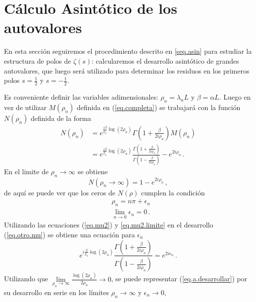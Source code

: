 \section{Cálculo Asintótico de los autovalores}\label{seq.2.asin}

En esta sección seguiremos el procedimiento descrito en \ref{seq.asin} para estudiar la estructura de polos de $\zeta (s)$: calcularemos el desarrollo asintótico de grandes autovalores, que luego será utilizado para determinar los residuos en los primeros polos $s= \frac{1}{2}$ y $s= - \frac{1}{2}$.



Es conveniente definir las variables adimensionales: $\rho _n = \lambda _nL $ y $\beta = \alpha L$. Luego en vez de utilizar $M (\rho _n)$ definida en (\ref{eq.completa}) se trabajará con la función $N (\rho _n)$ definida de la forma
\begin{align}
\label{eq.otro.mu}
\nonumber
N (\rho _n) &=
e ^{\frac{i \beta }{\rho _n} \log(2 \rho _n) }
\Gamma \left( 1 + \frac{ \beta}{2 i \rho _n} \right)
M (\rho _n) \\ 
&=  
e ^{\frac{i \beta }{\rho _n} \log(2 \rho _n) }
\frac{\Gamma \left(1 + \frac{ \beta}{2 i \rho _n} \right)}
	{\Gamma \left(1 - \frac{ \beta}{2 i \rho _n} \right)}
- e ^{2 i \rho _n}
\, .
\end{align}
En el limite de $\rho _n \rightarrow \infty$ se obtiene
\begin{equation}
    N(\rho _n  \rightarrow \infty) = 
	1 - e ^{2 i \rho _n}
		\, ,
\end{equation}
de aquí se puede ver que los ceros de $N ( \rho ) $ cumplen la condición
\begin{align}
\label{eq.mu2}
    &\rho _n = n \pi + \epsilon _n \\[5pt]
\label{eq.mu2.limite}
	&\lim \limits _{n \rightarrow{0}} \epsilon _n  = 0
		\, .
\end{align}
Utilizando las ecuaciones (\ref{eq.mu2}) y \eqref{eq.mu2.limite} en el desarrollo (\ref{eq.otro.mu}) se obtiene una ecuación para $\epsilon _n$
\begin{equation}
	e ^{ i \frac{\beta}{ \rho _n} \log (2 \rho _n)}     
    \frac{\Gamma(1 + \frac{ \beta}{2  i \rho _n} ) }
    {\Gamma(1 -  \frac{ \beta}{2  i \rho _n} )} =    
    e ^{2 i \epsilon _n }
    	\, .
\label{eq.a.desarrollar}
\end{equation}
Utilizando que  $ \lim \limits_{\rho _n \rightarrow \infty} \frac{\log (2 \rho _n)}{2 \rho _n } \rightarrow 0$, se puede representar (\ref{eq.a.desarrollar}) por su desarrollo en serie en los límites $ \rho _n \rightarrow \infty $ y $\epsilon _n \rightarrow 0$,
